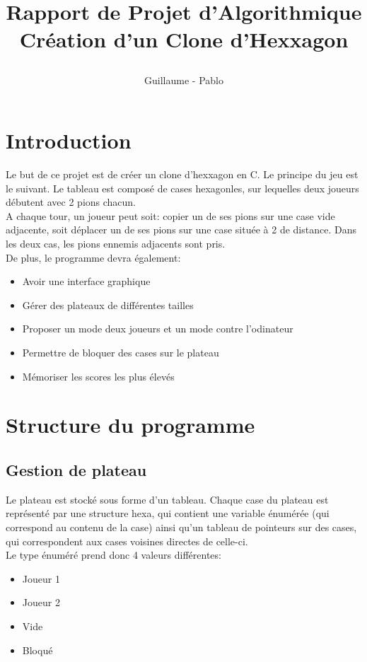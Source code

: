 \documentclass{report}
\begin{document}
\title{%
    \begin{minipage}\linewidth
        \centering
        Rapport de Projet d'Algorithmique
        \vskip 3pt
        \large Création d'un Clone d'Hexxagon
    \end{minipage}
}
\author{Guillaume  - Pablo }
\maketitle

\section{Introduction}

Le but de ce projet est de créer un clone d'hexxagon en C. Le principe du jeu est le suivant. Le tableau est composé de cases hexagonles, sur lequelles deux joueurs débutent avec 2 pions chacun.\\

A chaque tour, un joueur peut soit: copier un de ses pions sur une case vide adjacente, soit déplacer un de ses pions sur une case située à 2 de distance. Dans les deux cas, les pions ennemis adjacents sont pris.\\

De plus, le programme devra également: \begin{itemize}
\item Avoir une interface graphique
\item Gérer des plateaux de différentes tailles
\item Proposer un mode deux joueurs et un mode contre l'odinateur
\item Permettre de bloquer des cases sur le plateau 
\item Mémoriser les scores les plus élevés
\end {itemize}
\newpage
	
\section{Structure du programme}

	\subsection{Gestion de plateau}
		Le plateau est stocké sous forme d'un tableau.
		Chaque case du plateau est représenté par une structure hexa, qui contient une variable énumérée (qui correspond au contenu de la case) ainsi qu'un tableau de pointeurs sur des cases, qui correspondent aux cases voisines directes de celle-ci.\\
		Le type énuméré prend donc 4 valeurs différentes: 	\begin{itemize}
									\item Joueur 1
								  	\item Joueur 2
								  	\item Vide
								  	\item Bloqué
								  	\end{itemize}
	
\end{document}

